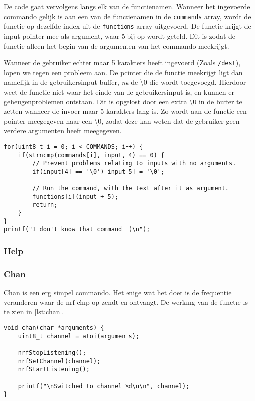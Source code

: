 De code gaat vervolgens langs elk van de functienamen. Wanneer het ingevoerde commando gelijk is aan een van de functienamen in de \texttt{commands} array, wordt de functie op dezelfde index uit de \texttt{functions} array uitgevoerd. De functie krijgt de input pointer mee als argument, waar 5 bij op wordt geteld. Dit is zodat de functie alleen het begin van de argumenten van het commando meekrijgt.

Wanneer de gebruiker echter maar 5 karakters heeft ingevoerd (Zoals \texttt{/dest}), lopen we tegen een probleem aan. De pointer die de functie meekrijgt ligt dan namelijk in de gebruikersinput buffer, \textit{na} de \textbackslash0 die wordt toegevoegd. Hierdoor weet de functie niet waar het einde van de gebruikersinput is, en kunnen er geheugenproblemen ontstaan. Dit is opgelost door een extra \textbackslash0 in de buffer te zetten wanneer de invoer maar 5 karakters lang is. Zo wordt aan de functie een pointer meegegeven naar een \textbackslash0, zodat deze kan weten dat de gebruiker geen verdere argumenten heeft meegegeven.

\begin{lstlisting}[caption={De code die het ingevoerde commando als functie uitvoert},captionpos=b,label={lst:interpretInputRun},style=c,xleftmargin=.\textwidth,xrightmargin=.\textwidth]
for(uint8_t i = 0; i < COMMANDS; i++) {
    if(strncmp(commands[i], input, 4) == 0) {
        // Prevent problems relating to inputs with no arguments.
        if(input[4] == '\0') input[5] = '\0';

        // Run the command, with the text after it as argument.
        functions[i](input + 5);
        return;
    }
}
printf("I don't know that command :(\n");
\end{lstlisting}



\subsubsection{Help}


\subsubsection{Chan}
Chan is een erg simpel commando. Het enige wat het doet is de frequentie veranderen waar de nrf chip op zendt en ontvangt. De werking van de functie is te zien in \autoref{lst:chan}.
\begin{lstlisting}[caption={De chan functie},captionpos=b,label={lst:chan},style=c,xleftmargin=.\textwidth,xrightmargin=.\textwidth]
void chan(char *arguments) {
    uint8_t channel = atoi(arguments);

    nrfStopListening();
    nrfSetChannel(channel);
    nrfStartListening();

    printf("\nSwitched to channel %d\n\n", channel);
}
\end{lstlisting}

